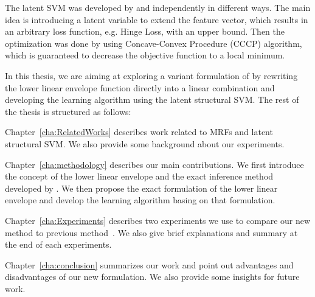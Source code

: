 The latent SVM was developed by
 and
 independently in different ways. The
main idea is introducing a latent variable to extend the feature
vector, which results in an arbitrary loss function, e.g. Hinge
Loss, with an upper bound. Then the optimization was done by
using Concave-Convex Procedure (CCCP) algorithm, which is
guaranteed to decrease the objective function to a local minimum.
 
In this thesis, we are aiming at exploring a variant formulation
of  by rewriting the lower linear
envelope function directly into a linear combination and
developing the learning algorithm using the latent structural
SVM. The rest of the thesis is structured as follows:

Chapter~\ref{cha:RelatedWorks} describes work related to MRFs and
latent structural SVM. We also provide some background about our
experiments. 

Chapter~\ref{cha:methodology} describes our main contributions.
We first introduce the concept of the lower linear envelope and
the exact inference method developed by .
We then propose the exact formulation of the lower linear
envelope and develop the learning algorithm basing on that
formulation. 

Chapter~\ref{cha:Experiments} describes two experiments we use to
compare our new method to previous method~\cite{gouldlearning}.
We also give brief explanations and summary at the end of each
experiments. 

Chapter~\ref{cha:conclusion} summarizes our work and point out
advantages and disadvantages of our new formulation. We also
provide some insights for future work.

